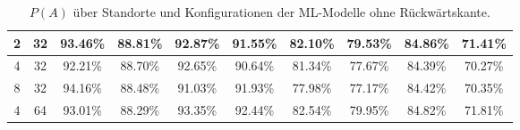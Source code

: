 \begin{table}
\begin{tabular}{ | c | c | c | c | c | c | c | c | c | c | }
        2 & 32 & 93.46\% & 88.81\% & 92.87\% & 91.55\% & 82.10\% & 79.53\% & 84.86\% & 71.41\% \\\hline
        4 & 32 & 92.21\% & 88.70\% & 92.65\% & 90.64\% & 81.34\% & 77.67\% & 84.39\% & 70.27\% \\\hline
        8 & 32 & 94.16\% & 88.48\% & 91.03\% & 91.93\% & 77.98\% & 77.17\% & 84.42\% & 70.35\% \\\hline
        4 & 64 & 93.01\% & 88.29\% & 93.35\% & 92.44\% & 82.54\% & 79.95\% & 84.82\% & 71.81\% \\\hline
    \end{tabular}
    \caption{$P(A)$ über Standorte und Konfigurationen der ML-Modelle ohne Rückwärtskante.}
    \label{tab:predictions_wo_feedback_edge_by_acc}
\end{table}

